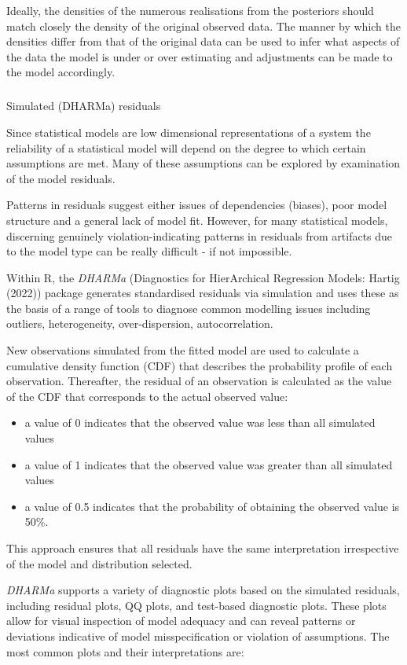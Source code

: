 \documentclass[
  8pt,
  a4paper]{article}
\makeatletter
\let\oldsubparagraph\subparagraph
\renewcommand{\subparagraph}{
    \@ifstar
      \xxxSubParagraphStar
      \xxxSubParagraphNoStar
  }
\newcommand{\xxxSubParagraphStar}[1]{\oldsubparagraph*{#1}\mbox{}}
\newcommand{\xxxSubParagraphNoStar}[1]{\oldsubparagraph{#1}\mbox{}}
\providecommand{\tightlist}{%
  \setlength{\itemsep}{0pt}\setlength{\parskip}{0pt}}
\makeatother
\begin{document}
Ideally, the densities of the numerous realisations from the posteriors
should match closely the density of the original observed data. The
manner by which the densities differ from that of the original data can
be used to infer what aspects of the data the model is under or over
estimating and adjustments can be made to the model accordingly.

\subparagraph{Simulated (DHARMa)
residuals}\label{simulated-dharma-residuals}

Since statistical models are low dimensional representations of a system
the reliability of a statistical model will depend on the degree to
which certain assumptions are met. Many of these assumptions can be
explored by examination of the model residuals.

Patterns in residuals suggest either issues of dependencies (biases),
poor model structure and a general lack of model fit. However, for many
statistical models, discerning genuinely violation-indicating patterns
in residuals from artifacts due to the model type can be really
difficult - if not impossible.

Within R, the \emph{DHARMa} (Diagnostics for HierArchical Regression
Models: Hartig (2022)) package generates standardised residuals via
simulation and uses these as the basis of a range of tools to diagnose
common modelling issues including outliers, heterogeneity,
over-dispersion, autocorrelation.

New observations simulated from the fitted model are used to calculate a
cumulative density function (CDF) that describes the probability profile
of each observation. Thereafter, the residual of an observation is
calculated as the value of the CDF that corresponds to the actual
observed value:

\begin{itemize}
\tightlist
\item
  a value of 0 indicates that the observed value was less than all
  simulated values
\item
  a value of 1 indicates that the observed value was greater than all
  simulated values
\item
  a value of 0.5 indicates that the probability of obtaining the
  observed value is 50\%.
\end{itemize}

This approach ensures that all residuals have the same interpretation
irrespective of the model and distribution selected.

\emph{DHARMa} supports a variety of diagnostic plots based on the
simulated residuals, including residual plots, QQ plots, and test-based
diagnostic plots. These plots allow for visual inspection of model
adequacy and can reveal patterns or deviations indicative of model
misspecification or violation of assumptions. The most common plots and
their interpretations are:
\end{document}
